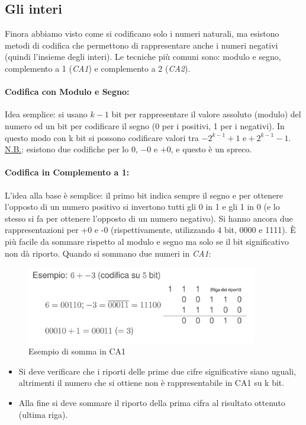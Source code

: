 \documentclass[class=book, crop=false]{standalone}
\begin{document}
\subsection{Gli interi} Finora abbiamo visto come si codificano solo i numeri naturali, ma esistono metodi di codifica che permettono di rappresentare anche i numeri negativi (quindi l’insieme degli interi). Le tecniche più comuni sono: modulo e segno, complemento a 1 (\emph{CA1}) e complemento a 2 (\emph{CA2}).

\paragraph*{Codifica con Modulo e Segno:} Idea semplice: si usano $k-1$ bit per rappresentare il valore assoluto (modulo) del numero  ed un bit per codificare il segno (0 per i positivi, 1 per i negativi). In questo modo con k bit si possono codificare valori tra $-2^{k-1}+1 \text{ e} +2^{k-1}-1$.\\
\underline{N.B.}: esistono due codifiche per lo $0$, $-0$  e $+0$, e questo è un spreco.

\paragraph*{Codifica in Complemento a 1:} L’idea alla base è semplice: il primo bit indica sempre il segno e per ottenere l’opposto di un numero positivo si invertono tutti gli 0 in 1 e gli 1 in 0 (e lo stesso si fa per ottenere l’opposto di un numero negativo). Si hanno ancora due rappresentazioni per +0 e -0 (rispettivamente, utilizzando 4 bit, 0000 e 1111). È più facile da sommare rispetto al modulo e segno ma solo se il bit significativo non dà riporto.
Quando si sommano due numeri in \emph{CA1}:
\begin{figure}[H]
	\centering
	\includegraphics[width=0.9\textwidth,keepaspectratio]{Somma-CA1.png}
	\caption{Esempio di somma in CA1}
\end{figure}
\begin{itemize}[noitemsep]
\item Si deve verificare che i riporti delle prime due cifre significative siano uguali, altrimenti il numero che si ottiene non è rappresentabile in CA1 su k bit.
\item Alla fine si deve sommare il riporto della prima cifra al risultato ottenuto (ultima riga).
\end{itemize}
\end{document}
